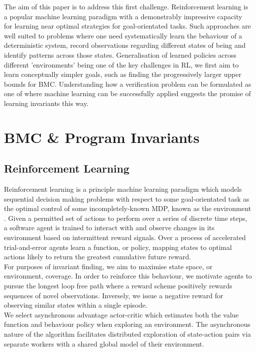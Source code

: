 \documentclass[runningheads]{llncs}
\begin{document}
The aim of this paper is to address this first challenge. Reinforcement learning is a popular machine learning paradigm with a demonstrably impressive capacity for learning near optimal strategies for goal-orientated tasks. Such approaches are well suited to problems where one need systematically learn the behaviour of a deterministic system, record observations regarding different states of being and identify patterns across those states. Generalisation of learned policies across different 'environments' being one of the key challenges in RL, we first aim to learn conceptually simpler goals, such as finding the progressively larger upper bounds for BMC. Understanding how a verification problem can be formulated as one of where machine learning can be successfully applied suggests the promise of learning invariants this way.

\section{BMC \& Program Invariants}\label{sec:preliminaries}


\subsection{Reinforcement Learning}

Reinforcement learning is a principle machine learning paradigm which models sequential decision making problems with respect to some goal-orientated task as the optimal control of some incompletely-known MDP, known as the environment  \cite{sutton2018reinforcement}. Given a permitted set of actions to perform over a series of discrete time steps, a software agent is trained to interact with and observe changes in its environment based on intermittent reward signals. Over a process of accelerated trial-and-error agents learn a function, or policy, mapping states to optimal actions likely to return the greatest cumulative future reward. \\ 

For purposes of invariant finding, we aim to maximise state space, or environment, coverage. In order to reinforce this behaviour, we motivate agents to pursue the longest loop free path where a reward scheme positively rewards sequences of novel observations. Inversely, we issue a negative reward for observing similar states within a single episode. \\

We select asynchronous advantage actor-critic which estimates both the value function and behaviour policy when exploring an environment. The asynchronous nature of the algorithm facilitates distributed exploration of state-action pairs via separate workers with a shared global model of their environment. \\
\end{document}
